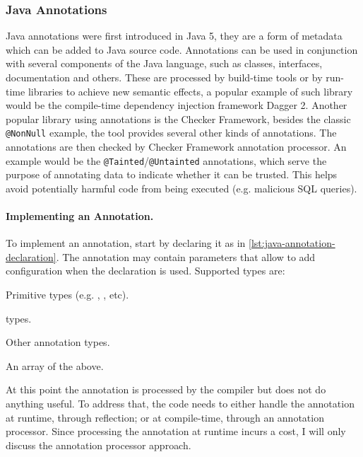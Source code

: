 \subsubsection*{Java Annotations}\label{sec:lang-preprocessors:java:annotation}

Java annotations were first introduced in Java 5,
they are a form of metadata which can be added to Java source code.
Annotations can be used in conjunction with several components of the Java language,
such as classes, interfaces, documentation and others.
These are processed by build-time tools or by run-time libraries to achieve new semantic effects,
a popular example of such library would be the compile-time dependency injection framework Dagger 2.
Another popular library using annotations is the Checker Framework,
besides the classic \texttt{@NonNull} example, the tool provides several other kinds of annotations.
The annotations are then checked by Checker Framework annotation processor.
An example would be the \texttt{@Tainted}/\texttt{@Untainted} annotations,
which serve the purpose of annotating data to indicate whether it can be trusted.
This helps avoid potentially harmful code from being executed (e.g. malicious SQL queries).







\paragraph{Implementing an Annotation.}
To implement an annotation, start by declaring it as in \autoref{lst:java-annotation-declaration}.
The annotation may contain parameters that allow to add configuration when the declaration is used.
Supported types are:
\begin{compactitem}
	\item Primitive types (e.g. , , etc).
	\item {}
	\item {}
	\item {} types.
	\item Other annotation types.
	\item An array of the above.
\end{compactitem}
At this point the annotation is processed by the compiler but does not do anything useful.
To address that, the code needs to either handle the annotation at runtime, through reflection;
or at compile-time, through an annotation processor.
Since processing the annotation at runtime incurs a cost, I will only discuss the annotation processor approach.

